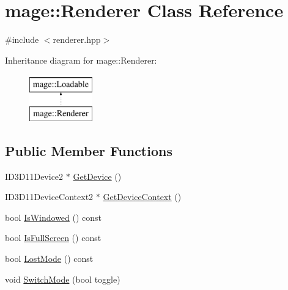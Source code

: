 \hypertarget{classmage_1_1_renderer}{}\section{mage\+:\+:Renderer Class Reference}
\label{classmage_1_1_renderer}


{\ttfamily \#include $<$renderer.\+hpp$>$}

Inheritance diagram for mage\+:\+:Renderer\+:\begin{figure}[H]
\begin{center}
\leavevmode
\includegraphics[height=2.000000cm]{classmage_1_1_renderer}
\end{center}
\end{figure}
\subsection*{Public Member Functions}
\begin{DoxyCompactItemize}
\item 
I\+D3\+D11\+Device2 $\ast$ \hyperlink{classmage_1_1_renderer_a38522d4b6933ef8f9ef5e46b713bdc95}{Get\+Device} ()
\item 
I\+D3\+D11\+Device\+Context2 $\ast$ \hyperlink{classmage_1_1_renderer_aa212ed67007115da62b6338f75e4eb75}{Get\+Device\+Context} ()
\item 
bool \hyperlink{classmage_1_1_renderer_a1de1804c1eedae7dc12435a520a10b9c}{Is\+Windowed} () const
\item 
bool \hyperlink{classmage_1_1_renderer_a5ae3220e19c68f47a8e4d55e3ced4694}{Is\+Full\+Screen} () const
\item 
bool \hyperlink{classmage_1_1_renderer_afdde83a1e2bc9288f000fb2575c525d0}{Lost\+Mode} () const
\item 
void \hyperlink{classmage_1_1_renderer_a9004ab608659188900c808eacb5f873c}{Switch\+Mode} (bool toggle)
\end{DoxyCompactItemize}
